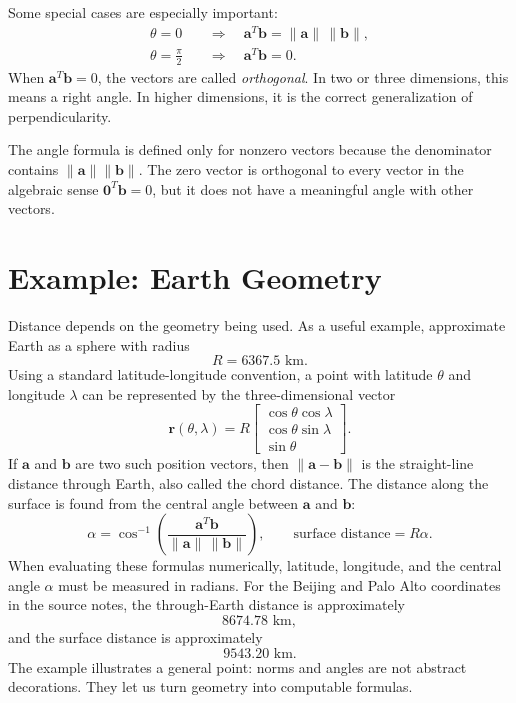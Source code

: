 Some special cases are especially important:
\[
\begin{aligned}
    \theta=0 &\quad\Longrightarrow\quad \mathbf{a}^T\mathbf{b}=\|\mathbf{a}\|\,\|\mathbf{b}\|,\\
    \theta=\frac{\pi}{2} &\quad\Longrightarrow\quad \mathbf{a}^T\mathbf{b}=0.
\end{aligned}
\]
When \(\mathbf{a}^T\mathbf{b}=0\), the vectors are called \emph{orthogonal}. In two or three dimensions, this means a right angle. In higher dimensions, it is the correct generalization of perpendicularity.

The angle formula is defined only for nonzero vectors because the denominator contains \(\|\mathbf{a}\|\|\mathbf{b}\|\). The zero vector is orthogonal to every vector in the algebraic sense \(\mathbf{0}^T\mathbf{b}=0\), but it does not have a meaningful angle with other vectors.

\section{Example: Earth Geometry}
\label{mf:earth-geometry-example}

Distance depends on the geometry being used. As a useful example, approximate Earth as a sphere with radius
\[
    R=6367.5\text{ km}.
\]
Using a standard latitude-longitude convention, a point with latitude \(\theta\) and longitude \(\lambda\) can be represented by the three-dimensional vector
\[
    \mathbf{r}(\theta,\lambda)
    =R\begin{bmatrix}
        \cos\theta\cos\lambda\\
        \cos\theta\sin\lambda\\
        \sin\theta
    \end{bmatrix}.
\]
If \(\mathbf{a}\) and \(\mathbf{b}\) are two such position vectors, then \(\|\mathbf{a}-\mathbf{b}\|\) is the straight-line distance through Earth, also called the chord distance. The distance along the surface is found from the central angle between \(\mathbf{a}\) and \(\mathbf{b}\):
\[
    \alpha=\cos^{-1}\left(\frac{\mathbf{a}^T\mathbf{b}}{\|\mathbf{a}\|\,\|\mathbf{b}\|}\right),
    \qquad
    \text{surface distance}=R\alpha.
\]
When evaluating these formulas numerically, latitude, longitude, and the central angle \(\alpha\) must be measured in radians.
For the Beijing and Palo Alto coordinates in the source notes, the through-Earth distance is approximately
\[
    8674.78\text{ km},
\]
and the surface distance is approximately
\[
    9543.20\text{ km}.
\]
The example illustrates a general point: norms and angles are not abstract decorations. They let us turn geometry into computable formulas.

